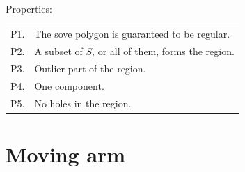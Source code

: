 %
Properties:
\\
\begin{tabular}{@{}ll@{}}
\toprule
P1. & The sove polygon is guaranteed to be regular.  \\  
P2. & A subset of $S$, or all of them, forms the region. \\ 
P3. & Outlier part of the region. \\ 
P4. & One component.  \\ 
P5. & No holes in the region.  \\  
\bottomrule
\end{tabular}



%
\section{Moving arm}

